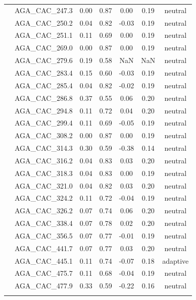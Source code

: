 \documentclass[11pt,]{article}
\begin{document}
\begin{longtable}[c]{@{}lcccccc@{}}
\\\addlinespace
& AGA\_CAC\_247.3 & 0.00 & 0.87 & 0.00 & 0.19 & neutral
\\\addlinespace
& AGA\_CAC\_250.2 & 0.04 & 0.82 & -0.03 & 0.19 & neutral
\\\addlinespace
& AGA\_CAC\_251.1 & 0.11 & 0.69 & 0.00 & 0.19 & neutral
\\\addlinespace
& AGA\_CAC\_269.0 & 0.00 & 0.87 & 0.00 & 0.19 & neutral
\\\addlinespace
& AGA\_CAC\_279.6 & 0.19 & 0.58 & NaN & NaN & neutral
\\\addlinespace
& AGA\_CAC\_283.4 & 0.15 & 0.60 & -0.03 & 0.19 & neutral
\\\addlinespace
& AGA\_CAC\_285.4 & 0.04 & 0.82 & -0.02 & 0.19 & neutral
\\\addlinespace
& AGA\_CAC\_286.8 & 0.37 & 0.55 & 0.06 & 0.20 & neutral
\\\addlinespace
& AGA\_CAC\_294.8 & 0.11 & 0.72 & 0.04 & 0.20 & neutral
\\\addlinespace
& AGA\_CAC\_299.4 & 0.11 & 0.69 & -0.05 & 0.19 & neutral
\\\addlinespace
& AGA\_CAC\_308.2 & 0.00 & 0.87 & 0.00 & 0.19 & neutral
\\\addlinespace
& AGA\_CAC\_314.3 & 0.30 & 0.59 & -0.38 & 0.14 & neutral
\\\addlinespace
& AGA\_CAC\_316.2 & 0.04 & 0.83 & 0.03 & 0.20 & neutral
\\\addlinespace
& AGA\_CAC\_318.3 & 0.04 & 0.83 & 0.00 & 0.19 & neutral
\\\addlinespace
& AGA\_CAC\_321.0 & 0.04 & 0.82 & 0.03 & 0.20 & neutral
\\\addlinespace
& AGA\_CAC\_324.2 & 0.11 & 0.72 & -0.04 & 0.19 & neutral
\\\addlinespace
& AGA\_CAC\_326.2 & 0.07 & 0.74 & 0.06 & 0.20 & neutral
\\\addlinespace
& AGA\_CAC\_338.4 & 0.07 & 0.78 & 0.02 & 0.20 & neutral
\\\addlinespace
& AGA\_CAC\_356.5 & 0.07 & 0.77 & -0.01 & 0.19 & neutral
\\\addlinespace
& AGA\_CAC\_441.7 & 0.07 & 0.77 & 0.03 & 0.20 & neutral
\\\addlinespace
& AGA\_CAC\_445.1 & 0.11 & 0.74 & -0.07 & 0.18 & adaptive
\\\addlinespace
& AGA\_CAC\_475.7 & 0.11 & 0.68 & -0.04 & 0.19 & neutral
\\\addlinespace
& AGA\_CAC\_477.9 & 0.33 & 0.59 & -0.22 & 0.16 & neutral
\\\addlinespace

\end{longtable}
\end{document}
